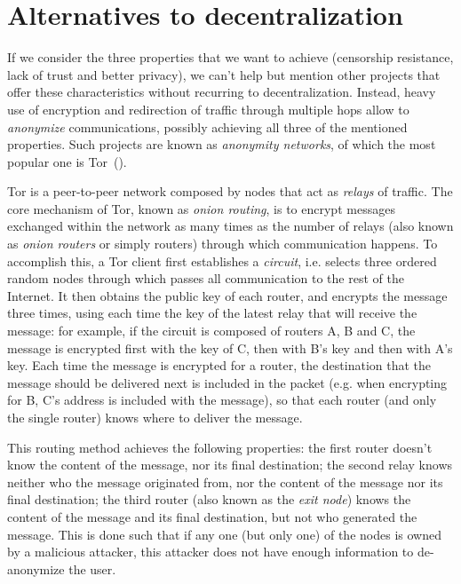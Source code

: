 \documentclass[mscthesis]{usiinfthesis}
\begin{document}
\section{Alternatives to decentralization}\label{proj:tor}

If we consider the three properties that we want to achieve (censorship resistance, lack of trust and better privacy), we can't help but mention other projects that offer these characteristics without recurring to decentralization. Instead, heavy use of encryption and redirection of traffic through multiple hops allow to \emph{anonymize} communications, possibly achieving all three of the mentioned properties. Such projects are known as \emph{anonymity networks}, of which the most popular one is Tor~(\cite{tor}).

Tor is a peer-to-peer network composed by nodes that act as \emph{relays} of traffic. The core mechanism of Tor, known as \emph{onion routing}, is to encrypt messages exchanged within the network as many times as the number of relays (also known as \emph{onion routers} or simply routers) through which communication happens. To accomplish this, a Tor client first establishes a \emph{circuit}, i.e. selects three ordered random nodes through which passes all communication to the rest of the Internet. It then obtains the public key of each router, and encrypts the message three times, using each time the key of the latest relay that will receive the message: for example, if the circuit is composed of routers A, B and C, the message is encrypted first with the key of C, then with B's key and then with A's key. Each time the message is encrypted for a router, the destination that the message should be delivered next is included in the packet (e.g. when encrypting for B, C's address is included with the message), so that each router (and only the single router) knows where to deliver the message.

This routing method achieves the following properties: the first router doesn't know the content of the message, nor its final destination; the second relay knows neither who the message originated from, nor the content of the message nor its final destination; the third router (also known as the \emph{exit node}) knows the content of the message and its final destination, but not who generated the message. This is done such that if any one (but only one) of the nodes is owned by a malicious attacker, this attacker does not have enough information to de-anonymize the user.
\end{document}
